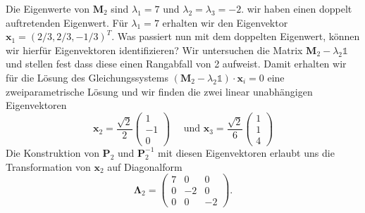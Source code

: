 Die Eigenwerte von $\mathbf{M}_2$ sind $\lambda_1=7$ und $\lambda_2=\lambda_3=-2$. wir haben einen doppelt auftretenden Eigenwert. Für $\lambda_1=7$ erhalten wir den Eigenvektor $\mathbf{x}_1=(2/3,2/3,-1/3)^T$. Was passiert nun mit dem doppelten Eigenwert, können wir hierfür Eigenvektoren identifizieren? Wir untersuchen die Matrix  $\mathbf{M}_2-\lambda_{2}\mathds{1}$ und stellen fest dass diese einen Rangabfall von 2 aufweist. Damit erhalten wir für die Lösung des Gleichungssystems $(\mathbf{M}_2-\lambda_{2}\mathds{1})\cdot\mathbf{x}_i=0$ eine zweiparametrische Lösung und wir finden die zwei linear unabhängigen Eigenvektoren
\[
\mathbf{x}_2=\frac{\sqrt{2}}{2}
\begin{pmatrix}1\\ -1\\ 0\end{pmatrix}
\quad\text{ und }
\mathbf{x}_3=\frac{\sqrt{2}}{6}
\begin{pmatrix}1\\ 1\\ 4\end{pmatrix}
\]
Die Konstruktion von $\mathbf{P}_2$ und $\mathbf{P}_2^{-1}$ mit diesen Eigenvektoren erlaubt uns die Transformation von $\mathbf{x}_2$ auf Diagonalform
\[
\bm{\Lambda}_2=
\begin{pmatrix}7&0&0\\0&-2&0\\0&0&-2\end{pmatrix}.
\]

